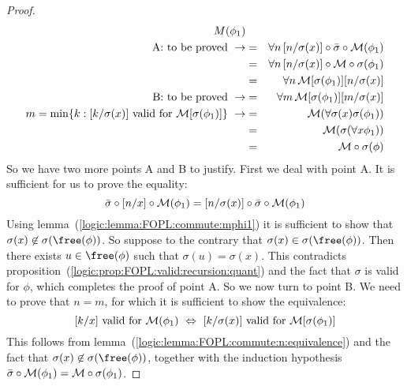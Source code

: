 \begin{proof}
\begin{eqnarray*}
{    M}(\phi_{1})\\
    \mbox{A: to be proved}\ \rightarrow
    &=&\forall n\,[n/\sigma(x)]\circ\bar{\sigma}\circ{\cal M}(\phi_{1})\\
    &=&\forall n\,[n/\sigma(x)]\circ{\cal M}\circ\sigma(\phi_{1})\\
    &=&\forall n\,{\cal M}[\sigma(\phi_{1})][n/\sigma(x)]\\
    \mbox{B: to be proved}\ \rightarrow
    &=&\forall m\,{\cal M}[\sigma(\phi_{1})][m/\sigma(x)]\\
    \mbox{$m=\min\{k:[k/\sigma(x)]\mbox{ valid for }{\cal M}[\sigma(\phi_{1})]\}$}\
    \rightarrow
    &=&{\cal M}(\forall\sigma(x)\sigma(\phi_{1}))\\
    &=&{\cal M}(\sigma(\forall x\phi_{1}))\\
    &=&{\cal M}\circ\sigma(\phi)
    \end{eqnarray*}
So we have two more points A and B to justify. First we deal with
point A. It is sufficient for us to prove the equality:
    \[
    \bar{\sigma}\circ [n/x]\circ{\cal
    M}(\phi_{1})= [n/\sigma(x)]\circ\bar{\sigma}\circ{\cal M}(\phi_{1})
    \]
Using lemma~(\ref{logic:lemma:FOPL:commute:mphi1}) it is sufficient
to show that $\sigma(x)\not\in\sigma(\free(\phi))$. So suppose to
the contrary that $\sigma(x)\in\sigma(\free(\phi))$. Then there
exists $u\in\free(\phi)$ such that $\sigma(u)=\sigma(x)$. This
contradicts
proposition~(\ref{logic:prop:FOPL:valid:recursion:quant}) and the
fact that $\sigma$ is valid for $\phi$, which completes the proof of
point A. So we now turn to point B. We need to prove that $n=m$, for
which it is sufficient to show the equivalence:
    \[
    \mbox{$[k/x]$ valid for ${\cal M}(\phi_{1})$}\ \Leftrightarrow
    \ \mbox{$[k/\sigma(x)]$ valid for ${\cal M}[\sigma(\phi_{1})]$}
    \]
This follows from
lemma~(\ref{logic:lemma:FOPL:commute:n:equivalence}) and the fact
that  $\sigma(x)\not\in\sigma(\free(\phi))$, together with the
induction hypothesis $\bar{\sigma}\circ{\cal M}(\phi_{1})={\cal
M}\circ\sigma(\phi_{1})$.
\end{proof}
